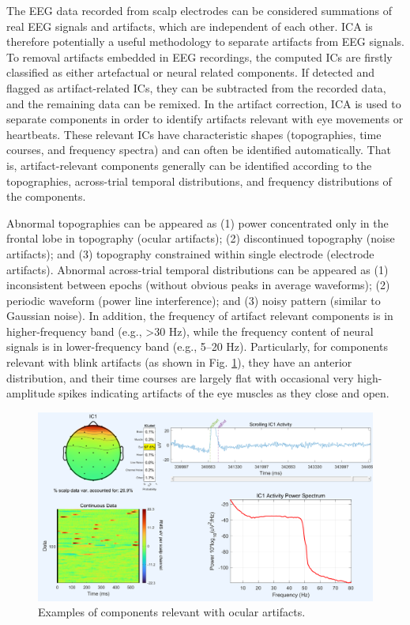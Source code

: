 \documentclass[12pt,a4paper,titlepage,openany]{report}
\begin{document}
The EEG data recorded from scalp electrodes can be considered summations of real EEG signals and artifacts, which are independent of each other. ICA is therefore potentially a useful methodology to separate artifacts from EEG signals. To removal artifacts embedded in EEG recordings, the computed ICs are ﬁrstly classiﬁed as either artefactual or neural related components. If detected and ﬂagged as artifact-related ICs, they can be subtracted from the recorded data, and the remaining data can be remixed. In the artifact correction, ICA is used to separate components in order to identify artifacts relevant with eye movements or heartbeats. 
These relevant ICs have characteristic shapes (topographies, time courses, and frequency spectra) and can often be identiﬁed automatically. 
That is, artifact-relevant components generally can be identiﬁed according to the topographies, across-trial temporal distributions, and frequency distributions of the components. 

Abnormal topographies can be appeared as (1) power concentrated only in the frontal lobe in topography (ocular artifacts); (2) discontinued topography (noise artifacts); and (3) topography constrained within single electrode (electrode artifacts). 
Abnormal across-trial temporal distributions can be appeared as (1) inconsistent between epochs (without obvious peaks in average waveforms); (2) periodic waveform (power line interference); and (3) noisy pattern (similar to Gaussian noise). 
In addition, the frequency of artifact relevant components is in higher-frequency band (e.g., \textgreater 30 Hz), while the frequency content of neural signals is in lower-frequency band (e.g., 5–20 Hz). 
Particularly, for components relevant with blink artifacts (as shown in Fig. \ref{fig:ICA}), they have an anterior distribution, and their time courses are largely ﬂat with occasional very high-amplitude spikes indicating artifacts of the eye muscles as they close and open.

\begin{figure}[H]
     \centering
     \includegraphics[width=1\linewidth]{./Chapter3_Methodology/Eye-blink via ICA label.png}
     \caption{Examples of components relevant with ocular artifacts.}
     \label{fig:ICA}
\end{figure}
\end{document}
